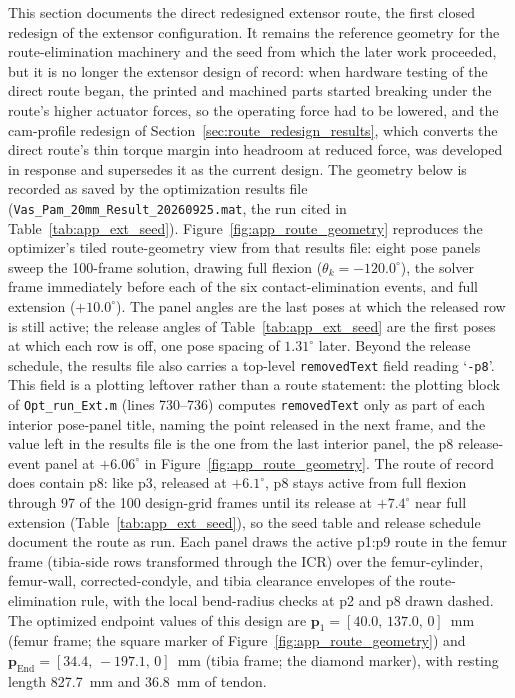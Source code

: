 This section documents the direct redesigned extensor route, the first closed redesign of the extensor configuration. It remains the reference geometry for the route-elimination machinery and the seed from which the later work proceeded, but it is no longer the extensor design of record: when hardware testing of the direct route began, the printed and machined parts started breaking under the route's higher actuator forces, so the operating force had to be lowered, and the cam-profile redesign of Section~\ref{sec:route_redesign_results}, which converts the direct route's thin torque margin into headroom at reduced force, was developed in response and supersedes it as the current design. The geometry below is recorded as saved by the optimization results file (\texttt{Vas\_Pam\_20mm\_Result\_20260925.mat}, the run cited in Table~\ref{tab:app_ext_seed}). Figure~\ref{fig:app_route_geometry} reproduces the optimizer's tiled route-geometry view from that results file: eight pose panels sweep the 100-frame solution, drawing full flexion ($\theta_{k}=-120.0^{\circ}$), the solver frame immediately before each of the six contact-elimination events, and full extension ($+10.0^{\circ}$). The panel angles are the last poses at which the released row is still active; the release angles of Table~\ref{tab:app_ext_seed} are the first poses at which each row is off, one pose spacing of $1.31^{\circ}$ later. Beyond the release schedule, the results file also carries a top-level \texttt{removedText} field reading `\texttt{-p8}'. This field is a plotting leftover rather than a route statement: the plotting block of \texttt{Opt\_run\_Ext.m} (lines 730--736) computes \texttt{removedText} only as part of each interior pose-panel title, naming the point released in the next frame, and the value left in the results file is the one from the last interior panel, the p8 release-event panel at $+6.06^{\circ}$ in Figure~\ref{fig:app_route_geometry}. The route of record does contain p8: like p3, released at $+6.1^{\circ}$, p8 stays active from full flexion through 97 of the 100 design-grid frames until its release at $+7.4^{\circ}$ near full extension (Table~\ref{tab:app_ext_seed}), so the seed table and release schedule document the route as run. Each panel draws the active p1:p9 route in the femur frame (tibia-side rows transformed through the ICR) over the femur-cylinder, femur-wall, corrected-condyle, and tibia clearance envelopes of the route-elimination rule, with the local bend-radius checks at p2 and p8 drawn dashed. The optimized endpoint values of this design are $\mathbf{p}_{1} = [40.0,\,137.0,\,0]$~mm (femur frame; the square marker of Figure~\ref{fig:app_route_geometry}) and $\mathbf{p}_{\text{End}} = [34.4,\,-197.1,\,0]$~mm (tibia frame; the diamond marker), with resting length \qty{827.7}{\mm} and \qty{36.8}{\mm} of tendon.

